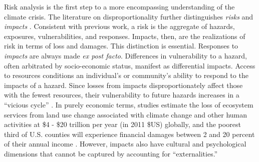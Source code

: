 Risk analysis is the first step to a more encompassing understanding of the climate
crisis. The literature on disproportionality further distinguishes
\textit{risks} and \textit{impacts} \cite{dorkenoo_critical_2022}. Consistent
with previous work, a risk is the aggregate of hazards, exposures,
vulnerabilities, and responses. Impacts, then, are the realizations of risk in
terms of loss and damages. This distinction is essential. Responses to
\textit{impacts} are always made \textit{ex post facto}. Differences in
vulnerability to a hazard, often arbitrated by socio-economic status, manifest
as differential impacts. Access to resources conditions an individual's or
community's ability to respond to the impacts of a hazard. Since losses from
impacts disproportionately affect those with the fewest resources, their
vulnerability to future hazards increases in a ``vicious cycle''
\cite{islam_climate_2017, dorkenoo_critical_2022}. In purely economic terms,
studies estimate the loss of ecosystem services from land use change associated
with climate change and other human activities at \$4 - \$20 trillion per year
(in 2011 \$US) globally, \cite{costanza_changes_2014} and the poorest third of
U.S. counties will experience financial damages between 2 and 20 percent of
their annual income \cite{hsiang_estimating_2017}. However, impacts also have
cultural and psychological dimensions \cite{dorkenoo_critical_2022} that cannot
be captured by accounting for ``externalities.''



